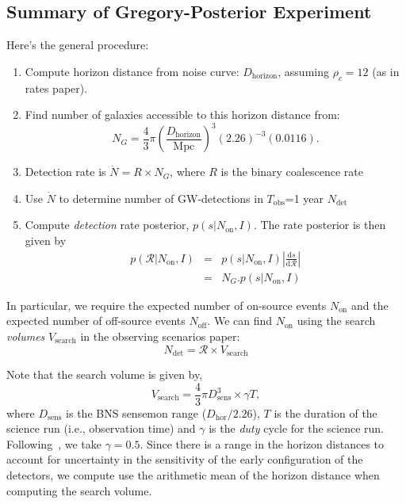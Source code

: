 \documentclass[twocolumn,nofootinbib]{revtex4-1}
\newcommand{\cbcrate}{{{\mathcal R}}}
\newcommand{\diff}{{\mathrm d}}
\begin{document}
\subsection{Summary of Gregory-Posterior Experiment}
Here's the general procedure:
\begin{enumerate}
\item Compute horizon distance from noise curve: $D_{\mathrm{horizon}}$,
assuming $\rho_c=12$ (as in rates paper).
\item Find number of galaxies accessible to this horizon distance from:
\begin{equation}
N_G = \frac{4}{3} \pi \left( \frac{D_{\textrm{horizon}}}{\textrm{Mpc}}
\right)^3 (2.26)^{-3} (0.0116).
\end{equation}
\item Detection rate is $\dot{N} = R \times N_G$, where $R$ is the binary
coalescence rate
\item Use $\dot{N}$ to determine number of GW-detections in $T_{\mathrm{obs}}$=1 year
$N_{\mathrm{det}}$
\item Compute \emph{detection} rate posterior, $p(s|N_{\textrm{on}},I)$.  The
rate posterior is then given by 
\begin{eqnarray}
p(\cbcrate|N_{\textrm{on}},I) & = & p(s|N_{\textrm{on}},I) \left|\frac{\diff
s}{\diff \cbcrate}\right| \\
& = & N_G . p(s|N_{\textrm{on}},I)
\end{eqnarray}
\end{enumerate}

In particular, we require the expected number of on-source events
$N_{\mathrm{on}}$ and the expected number of off-source events
$N_{\mathrm{off}}$.  We can find $N_{\mathrm{on}}$ using the search
\emph{volumes} $V_{\mathrm{search}}$ in the observing scenarios paper:
%
\begin{equation}
N_{\mathrm{det}} = \cbcrate \times V_{\mathrm{search}}
\end{equation}



Note that the search volume is given by,
\begin{equation}\label{eq:search_volume}
V_{\mathrm{search}} = \frac{4}{3}\pi D_{\mathrm{sens}}^3 \times \gamma T,
\end{equation}
%
where $D_{\mathrm{sens}}$ is the BNS sensemon range ($D_{\mathrm{hor}}/2.26$),
$T$ is the duration of the science run (i.e., observation time) and $\gamma$ is
the \emph{duty} cycle for the science run.  Following~\cite{ade_prospects}, we
take $\gamma=0.5$.  Since there is a range in the horizon distances to account
for uncertainty in the sensitivity of the early configuration of the detectors,
we compute use the arithmetic mean of the horizon distance when computing the
search volume.
\end{document}
